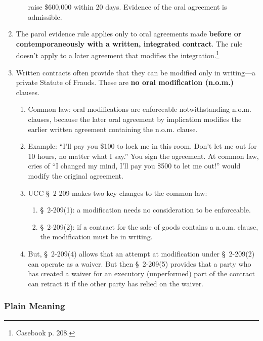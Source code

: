 \begin{enumerate}
\begin{enumerate}
        raise \$600,000 within 20 days. Evidence of the oral agreement is 
        admissible.
    \end{enumerate}
    \item The parol evidence rule applies only to oral agreements made 
    \textbf{before or contemporaneously with a written, integrated contract}. 
    The rule doesn't apply to a later agreement that modifies the 
    integration.\footnote{Casebook p. 208.}
    \item Written contracts often provide that they can be modified only in 
    writing---a private Statute of Frauds. These are \textbf{no oral 
    modification (n.o.m.)} clauses.
    \begin{enumerate}
        \item Common law: oral modifications are enforceable notwithstanding 
        n.o.m. clauses, because the later oral agreement by implication modifies 
        the earlier written agreement containing the n.o.m. clause.
        \item Example: ``I'll pay you \$100 to lock me in this room. Don't let me 
        out for 10 hours, no matter what I say.'' You sign the agreement. At 
        common law, cries of ``I changed my mind, I'll pay you \$500 to let me 
        out!'' would modify the original agreement.
        \item UCC \S\ 2-209 makes two key changes to the common law:
        \begin{enumerate}
            \item \S\ 2-209(1): a modification needs no consideration to be 
            enforceable.
            \item \S\ 2-209(2): if a contract for the sale of goods contains a 
            n.o.m. clause, the modification must be in writing.
        \end{enumerate}
        \item But, \S\ 2-209(4) allows that an attempt at modification under \S\ 
        2-209(2) can operate as a waiver. But then \S\ 2-209(5) provides that a 
        party who has created a waiver for an executory (unperformed) part of the 
        contract can retract it if the other party has relied on the waiver.
    \end{enumerate}
\end{enumerate}

\subsubsection{Plain Meaning}

